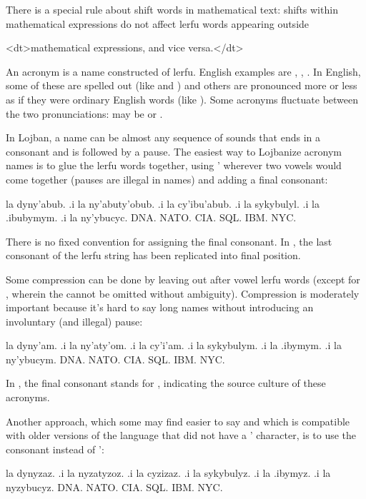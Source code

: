 There is a special rule about shift words in mathematical
    text: shifts within mathematical expressions do not affect
    lerfu words appearing outside
\begin{description}
      <dt>mathematical expressions, and vice versa.</dt>
\end{description}



An acronym is a name constructed of lerfu. English examples
    are , , . In English, some of these are
    spelled out (like  and ) and others are
    pronounced more or less as if they were ordinary English words
    (like ). Some acronyms fluctuate between the two
    pronunciations:  may be  or
    .

In Lojban, a name can be almost any sequence of sounds that
    ends in a consonant and is followed by a pause. The easiest way
    to Lojbanize acronym names is to glue the lerfu words together,
    using \q{}' wherever two vowels would come together (pauses are
    illegal in names) and adding a final consonant:
\begin{example}
la dyny'abub. .i la ny'abuty'obub.\n
.i la cy'ibu'abub. .i la sykybulyl.\n
.i la .ibubymym. .i la ny'ybucyc.\n
DNA. NATO.\n
CIA. SQL.\n
IBM. NYC.
\end{example}

There is no fixed convention for assigning the final consonant.
    In , the last consonant of the
    lerfu string has been replicated into final position. 

Some compression can be done by leaving out  after
    vowel lerfu words (except for , wherein the 
    cannot be omitted without ambiguity). Compression is moderately
    important because it's hard to say long names without
    introducing an involuntary (and illegal) pause:
\begin{example}
la dyny'am. .i la ny'aty'om.\n
.i la cy'i'am. .i la sykybulym.\n
.i la .ibymym. .i la ny'ybucym.\n
DNA. NATO.\n
CIA. SQL.\n
IBM. NYC.
\end{example}

In , the final consonant
     stands for , indicating the source culture of
    these acronyms.

Another approach, which some may find easier to say and
    which is compatible with older versions of the language that
    did not have a \q{}' character, is to use the consonant 
    instead of \q{}':
\begin{example}
la dynyzaz. .i la nyzatyzoz.\n
.i la cyzizaz. .i la sykybulyz.\n
.i la .ibymyz. .i la nyzybucyz.\n
DNA. NATO.\n
CIA. SQL.\n
IBM. NYC.
\end{example}

